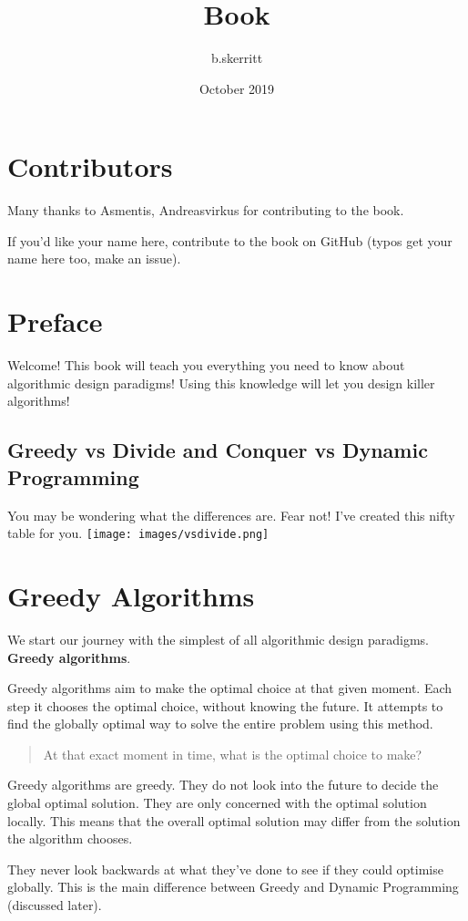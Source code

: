 \documentclass{article}
\title{Book}
\author{b.skerritt }
\date{October 2019}
\begin{document}
\raggedright

\newpage
\section{Contributors}
Many thanks to Asmentis, Andreasvirkus for contributing to the book.

If you'd like your name here, contribute to the book on GitHub (typos get your name here too, make an issue).
\tableofcontents
\newpage
{}
\setcounter{page}{1}
\section{Preface}
Welcome! This book will teach you everything you need to know about algorithmic design paradigms! Using this knowledge will let you design killer algorithms! 

\subsection{Greedy vs Divide and Conquer vs Dynamic Programming}
You may be wondering what the differences are. Fear not! I've created this nifty table for you.
\texttt{[image: images/vsdivide.png]}
\newpage

\section{Greedy Algorithms}
We start our journey with the simplest of all algorithmic design paradigms. \textbf{Greedy algorithms}.

Greedy algorithms aim to make the optimal choice at that given moment. Each step it chooses the optimal choice, without knowing the future. It attempts to find the globally optimal way to solve the entire problem using this method.

\begin{quote}
    At that exact moment in time, what is the optimal choice to make?
\end{quote}

Greedy algorithms are greedy. They do not look into the future to decide the global optimal solution. They are only concerned with the optimal solution locally. This means that the overall optimal solution may differ from the solution the algorithm chooses.

They never look backwards at what they've done to see if they could optimise globally. This is the main difference between Greedy and Dynamic Programming (discussed later).
\end{document}
